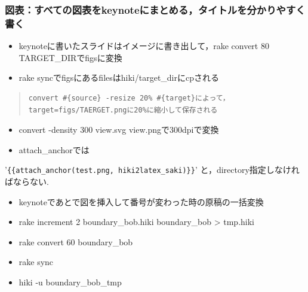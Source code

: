 \subsubsection{図表：すべての図表をkeynoteにまとめる，タイトルを分かりやすく書く}\begin{itemize}
\item keynoteに書いたスライドはイメージに書き出して，rake convert 80 TARGET\_DIRでfigsに変換
\item rake syncでfigsにあるfilesはhiki/target\_dirにcpされる
\end{itemize}\begin{quote}\begin{verbatim}
convert #{source} -resize 20% #{target}によって，target=figs/TAERGET.pngに20%に縮小して保存される
\end{verbatim}\end{quote}\begin{itemize}
\item convert -density 300 view.svg view.pngで300dpiで変換
\item attach\_anchorでは
\end{itemize}
'\verb|{{attach_anchor(test.png, hiki2latex_saki)}}|'
と，directory指定しなければならない.
\begin{itemize}
\item keynoteであとで図を挿入して番号が変わった時の原稿の一括変換
\item rake increment 2 boundary\_bob.hiki boundary\_bob > tmp.hiki
\item rake convert 60 boundary\_bob
\item rake sync
\item hiki -u boundary\_bob\_tmp
\end{itemize}
